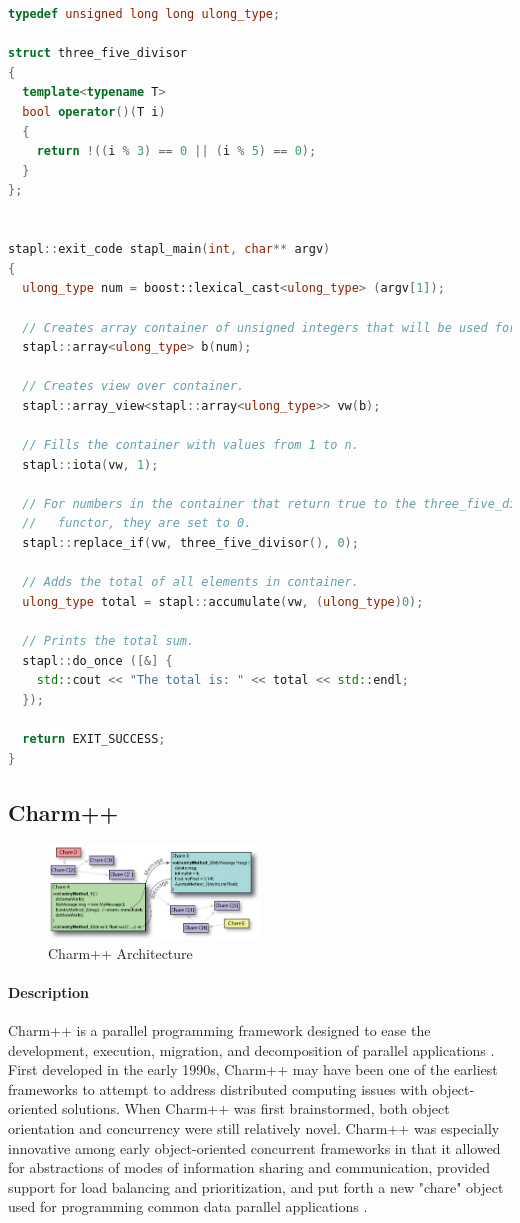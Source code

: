 {\begin{lstlisting}[language=C++, caption=STAPL code sample for Project Euler number 1. Headers and doxygen comments removed for brevity, captionpos=b]
typedef unsigned long long ulong_type;

struct three_five_divisor
{
  template<typename T>
  bool operator()(T i)
  {
    return !((i % 3) == 0 || (i % 5) == 0);
  }
};


stapl::exit_code stapl_main(int, char** argv)
{
  ulong_type num = boost::lexical_cast<ulong_type> (argv[1]);

  // Creates array container of unsigned integers that will be used for storage.
  stapl::array<ulong_type> b(num);

  // Creates view over container.
  stapl::array_view<stapl::array<ulong_type>> vw(b);

  // Fills the container with values from 1 to n.
  stapl::iota(vw, 1);

  // For numbers in the container that return true to the three_five_divisor
  //   functor, they are set to 0.
  stapl::replace_if(vw, three_five_divisor(), 0);

  // Adds the total of all elements in container.
  ulong_type total = stapl::accumulate(vw, (ulong_type)0);

  // Prints the total sum.
  stapl::do_once ([&] {
    std::cout << "The total is: " << total << std::endl;
  });

  return EXIT_SUCCESS;
} \end{lstlisting}
\normalsize
\subsection{Charm++}
\begin{figure}[h]
	\centering
	\includegraphics[width=0.5\textwidth]{Figures/charm_arch.jpg}
	\caption{Charm++ Architecture \cite{charm_tutorial}}
	\label{fig:charm_arch}
\end{figure}
\paragraph{Description} \label{charm_desc}
Charm++ is a parallel programming framework designed to ease the development, execution, migration, and decomposition of parallel applications \cite{parallel_programming_w_charm}. First developed in the early 1990s, Charm++ may have been one of the earliest frameworks to attempt to address distributed computing issues with object-oriented solutions. When Charm++ was first brainstormed, both object orientation and concurrency were still relatively novel. Charm++ was especially innovative among early object-oriented concurrent frameworks in that it allowed for abstractions of modes of information sharing and communication, provided support for load balancing and prioritization, and put forth a new "chare" object used for programming common data parallel applications \cite{charm_93}. 

}
